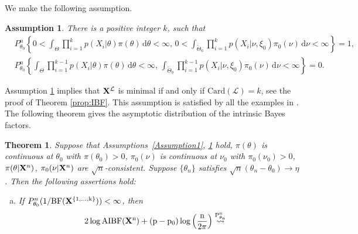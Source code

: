\documentclass[11pt]{article}
\theoremstyle{plain}
\newtheorem{theorem}{\quad\quad Theorem}
\newtheorem{lemma}{\quad\quad Lemma}
\newtheorem{assumption}{\quad\quad Assumption}
\theoremstyle{definition}
\theoremstyle{remark}
\begin{document}
\begin{appendices}
We make the following assumption.
\begin{assumption}\label{Assumption:IBF}
    There is a positive integer $k$, such that
\begin{align*}
&P_{\theta_0}^n 
\left\{
0< \int_{\Theta} \prod_{i=1}^k p (X_i| \theta) \pi(\theta) \, \mathrm d \theta  < \infty
,\,
    0< \int_{\tilde \Theta_0} \prod_{i=1}^k p (X_i| \nu, \xi_0) \pi_0(\nu) \, \mathrm d \nu  < \infty
\right\} = 1,
\\
&
P_{\theta_0}^n 
\left\{
    \int_{\Theta} \prod_{i=1}^{k-1} p (X_i| \theta) \pi(\theta) \, \mathrm d \theta  < \infty
,\,
    \int_{\tilde \Theta_0} \prod_{i=1}^{k-1} p (X_i| \nu, \xi_0) \pi_0(\nu) \, \mathrm d \nu  < \infty
\right\} = 0.
\end{align*}
\end{assumption}     
Assumption \ref{Assumption:IBF} implies that $\mathbf{X}^{\mathcal L}$ is minimal if and only if $\text{Card}(\mathcal L) = k$, see the proof of Theorem \ref{prop:IBF}.
This assumption is satisfied by all the examples in \cite{intrinsicBayesFactor}.
The following theorem gives the asymptotic distribution of the intrinsic Bayes factors.
\begin{theorem}
        Suppose that Assumptions~\ref{Assumption1}, \ref{Assumption:IBF} hold, $\pi(\theta)$ is continuous at $\theta_0$ with $\pi(\theta_0)>0$, $\pi_0(\nu)$ is continuous at $\nu_0$ with $\pi_0(\nu_0)>0$, $\pi(\theta |\mathbf{X}^{n})$, $\pi_0(\nu|\mathbf{X}^{n})$ are $\sqrt{n}$-consistent.
Suppose $\{\theta_n\}$ satisfies $\sqrt{n}(\theta_n-\theta_0)\to \eta$.
Then the following assertions hold:
\begin{enumerate}[(a)]
    \item 
        If $P_{\theta_0}^n ( 1 / \rm{BF}(\mathbf{X}^{\{1,\dots,k\}}) ) < \infty$, then
        \begin{align*}
            2 \log \rm{AIBF} (\BX^n) 
    +(p-p_0) \log \left( \frac{n}{2\pi} \right)
\overset{P^n_{\theta_n}}{\rightsquigarrow}
    &

\end{align*}
\end{enumerate}
\end{theorem}
\end{appendices}
\end{document}
